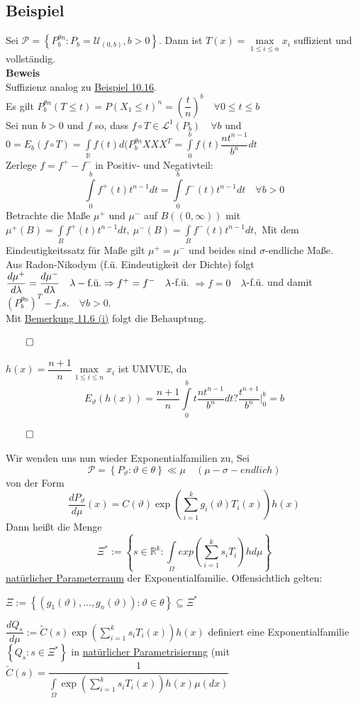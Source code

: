 \documentclass[german,10pt,oneside, fleqn, a4paper]{article}
\newcommand {\R}	{\mathbb{R}}
\newcommand{\Ra}	{\Rightarrow}
\newcommand{\sm}[2][\infty]{\sum\limits_{#2}^{#1}}
\newcommand{\brc}[1]{\left(#1\right)}
\newcommand{\brac}[1]{\left\lbrace #1\right\rbrace}
\newcommand{\QED}{\begin{flushright}$\qed$\end{flushright}}
\newcommand{\mc}[1]{\mathcal{#1}}
\newcommand{\lp}[1]{\mc{L}^{#1}}
\newcommand{\beweis}{\textbf{Beweis}\\}
\newcommand{\1}[1]{1_{#1}}
\newcommand{\2}[1]{\1{\brac{#1}}}
\newcommand{\intr}{\int\limits_\R}
\begin{document}
\subsection{Beispiel}
\label{11.10}
Sei $\mc{P}=\brac{P_b^{\theta n}:P_b=\mc{U}_{(0,b)},b>0}$. Dann ist $T(x)=\max\limits_{1\leq i\leq n}x_i$ suffizient und vollständig.\\
\beweis
Suffizienz analog zu \hyperref[10.16]{Beispiel 10.16}.\\
Es gilt $P_b^{\theta n}(T\leq t)=P(X_1\leq t)^n=\brc{\dfrac{t}{n}}^b\quad\forall 0\leq t\leq b$\\
Sei nun $b>0$ und $f$ so, dass $f\circ T\in\lp{1}(P_b)\quad\forall b$ und \\
$0=E_b(f\circ T)=\intr f(t)d(P_b^{\theta n} XXX^T=\int\limits_0^bf(t)\dfrac{nt^{n-1}}{b^n}dt$\\Zerlege $f=f^+-f^-$ in Positiv- und Negativteil:\[
\int\limits_0^bf^+(t)t^{n-1}dt=\int\limits_0^bf^-(t)t^{n-1}dt\quad\forall b>0\]
Betrachte die Maße $\mu^+$ und $\mu^-$ auf $B((0,\infty))$ mit $\mu^+(B)=\int\limits_Bf^+(t)t^{n-1}dt,\ \mu^-(B)=\int\limits_Bf^-(t)t^{n-1}dt,$
Mit dem Eindeutigkeitssatz für Maße gilt $\mu^+=\mu^-$ und beides sind $\sigma$-endliche Maße.\\
Aus Radon-Nikodym (f.ü. Eindeutigkeit der Dichte) folgt \\
$\dfrac{d\mu^+}{d\lambda}=\dfrac{d\mu^-}{d\lambda}\quad\lambda-\text{f.ü.}\\
\Ra f^+=f^-\quad \lambda$-f.ü. $\Ra f=0\quad\lambda$-f.ü. und damit $(P_b^{\theta n})^T-f.s.\quad\forall b>0$.\\
Mit \hyperref[11.6]{Bemerkung 11.6 (i)} folgt die Behauptung.\QED
$h(x)=\dfrac{n+1}{n}\max\limits_{1\leq i\leq n}x_i$ ist UMVUE, da \[E_\vartheta(h(x))=\dfrac{n+1}{n}\int\limits_0^bt\dfrac{nt^{n-1}}{b^n}dt?\dfrac{t^{n+1}}{b^n}\Bigg\vert_0^b=b\]\QED

Wir wenden uns nun wieder Exponentialfamilien zu, Sei \[
\mc{P}=\brac{P_\vartheta:\vartheta\in\theta}\ll\mu\quad(\mu-\sigma-endlich)\]
von der Form \[
\dfrac{dP_\vartheta}{d\mu}(x)=C(\vartheta)\exp \brc{\sm[k]{i=1}g_i(\vartheta)T_i(x)}h(x)\]
Dann heißt die Menge \[
\Xi^*:=\brac{s\in\R^k:\int\limits_\Omega exp(\sm[k]{i=1}s_iT_i)hd\mu}\]
\underline{natürlicher Parameterraum} der Exponentialfamilie.
Offensichtlich gelten:\begin{list}{•}{}
\item $\Xi:=\brac{(g_1(\vartheta),...,g_n(\vartheta)):\vartheta\in\theta}\subseteq\Xi^*$
\item $\dfrac{dQ_s}{d\mu}:=\tilde{C}(s)\exp\brc{\sm[k]{i=1}s_iT_i(x)}h(x)$ definiert eine Exponentialfamilie $\brac{Q_s:s\in\Xi^*}$ in \underline{natürlicher Parametrisierung} (mit $\tilde{C}(s)=\dfrac{1}{\int\limits_\Omega\exp\brc{\sm[k]{i=1}s_iT_i(x)}h(x)\mu(dx)}$
\end{list} 
\end{document}
